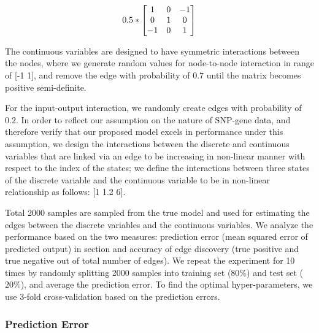\documentclass{article}
\begin{document}
\begin{align*}
\centering
0.5 * 
\begin{bmatrix}
  1 & 0 & -1 \\
  0 & 1 & 0 \\
  -1 & 0 & 1
\end{bmatrix}
\end{align*}

The continuous variables are designed to have symmetric interactions between the nodes, where we generate random values for node-to-node interaction in range of [-1 1], and remove the edge with probability of $0.7$ until the matrix becomes positive semi-definite.

For the input-output interaction, we randomly create edges with probability of $0.2$. 
In order to reflect our assumption on the nature of SNP-gene data, and therefore verify that our proposed model excels in performance under this assumption, we design the interactions between the discrete and continuous variables that are linked via an edge to be increasing in non-linear manner with respect to the index of the states;
we define the interactions between three states of the discrete variable and the continuous variable to be in non-linear relationship as follows: [1 1.2 6].



 Total 2000 samples are sampled from the true model and used for estimating the edges between the discrete variables and the continuous variables. 
 We analyze the performance based on the two measures: prediction error (mean squared error of predicted output) in section and accuracy of edge discovery (true positive and true negative out of total number of edges). 
We repeat the experiment for 10 times by randomly splitting 2000 samples into training set ($80 \%$) and test set ($20\%$), and average the prediction error.
 To find the optimal hyper-parameters, we use 3-fold cross-validation based on the prediction errors.
 
 
 
 
 

\subsubsection{Prediction Error}
\end{document}
